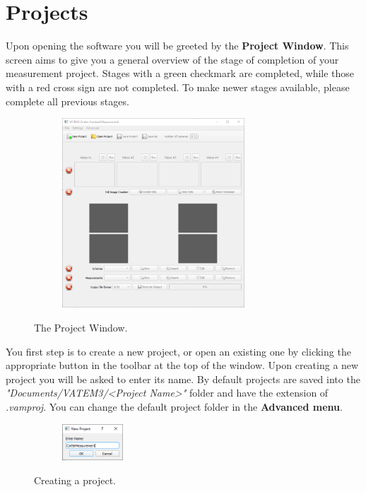 \documentclass[10pt,a4paper,oneside]{report}             %
\begin{document}
\section{Projects}

Upon opening the software you will be greeted by the \textbf{Project Window}. This screen aims to give you a general overview of the stage of completion of your measurement project. Stages with a green checkmark are completed, while those with a red cross sign are not completed. To make newer stages available, please complete all previous stages.

\begin{figure}[H]
	\centering
	\begin{subfigure}{\textwidth}
		\centering 
		\includegraphics[width=0.75\textwidth]{./images/MW1.png}
	\end{subfigure}
	\caption[]
	{\small  The Project Window.}
\end{figure} 

You first step is to create a new project, or open an existing one by clicking the appropriate button in the toolbar at the top of the window. Upon creating a new project you will be asked to enter its name. By default projects are saved into the \textit{"Documents/VATEM3/<Project Name>"} folder and have the extension of \textit{.vamproj}. You can change the default project folder in the \textbf{Advanced menu}.

\begin{figure}[H]
	\centering
	\begin{subfigure}{\textwidth}
		\centering 
		\includegraphics[width=0.25\textwidth]{./images/NewProj.png}
	\end{subfigure}
	\caption[]
	{\small  Creating a project.}
\end{figure} 
\end{document}
